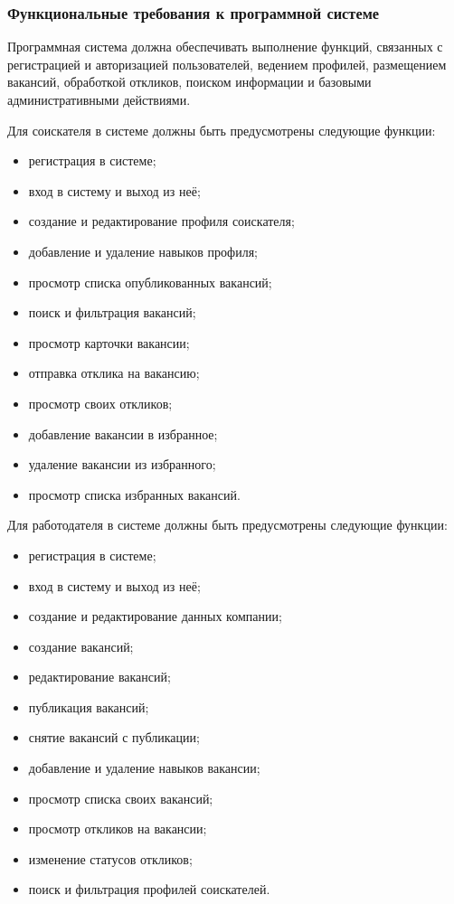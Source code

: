 \subsubsection{Функциональные требования к программной системе}

Программная система должна обеспечивать выполнение функций, связанных с регистрацией и авторизацией пользователей, ведением профилей, размещением вакансий, обработкой откликов, поиском информации и базовыми административными действиями.

Для соискателя в системе должны быть предусмотрены следующие функции:
\begin{itemize}
	\item регистрация в системе;
	\item вход в систему и выход из неё;
	\item создание и редактирование профиля соискателя;
	\item добавление и удаление навыков профиля;
	\item просмотр списка опубликованных вакансий;
	\item поиск и фильтрация вакансий;
	\item просмотр карточки вакансии;
	\item отправка отклика на вакансию;
	\item просмотр своих откликов;
	\item добавление вакансии в избранное;
	\item удаление вакансии из избранного;
	\item просмотр списка избранных вакансий.
\end{itemize}

Для работодателя в системе должны быть предусмотрены следующие функции:
\begin{itemize}
	\item регистрация в системе;
	\item вход в систему и выход из неё;
	\item создание и редактирование данных компании;
	\item создание вакансий;
	\item редактирование вакансий;
	\item публикация вакансий;
	\item снятие вакансий с публикации;
	\item добавление и удаление навыков вакансии;
	\item просмотр списка своих вакансий;
	\item просмотр откликов на вакансии;
	\item изменение статусов откликов;
	\item поиск и фильтрация профилей соискателей.
\end{itemize}

